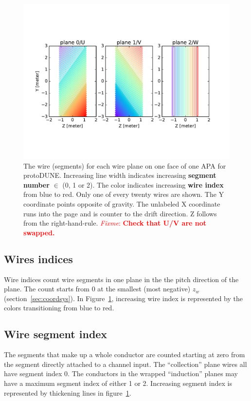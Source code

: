 \documentclass[pdftex,12pt,letter]{article}
\newcommand{\fixme}[1]{\textcolor{red}{\textit{Fixme}: \textbf{#1}}}
\begin{document}
\begin{figure}[htp]
  \centering
  \includegraphics[width=\textwidth,clip,trim=0 3cm 0 3cm]{wires-20.pdf}
  \caption{The wire (segments) for each wire plane on one face of one APA for protoDUNE.  Increasing line width indicates increasing \textbf{segment number} $\in$ (0, 1 or 2).  The color indicates increasing \textbf{wire index} from blue to red.  Only one of every twenty wires are shown. The Y coordinate points opposite of gravity.  The unlabeled X coordinate runs into the page and is counter to the drift direction.  Z follows from the right-hand-rule.  \fixme{Check that U/V are not swapped.}}
  \label{fig:wires}
\end{figure}


\subsection{Wires indices}

Wire indices count wire segments in one plane in the the pitch
direction of the plane.  The count starts from 0 at the smallest (most
negative) $z_w$ (section~\ref{sec:coordsys}).  In
Figure~\ref{fig:wires}, increasing wire index is represented by the
colors transitioning from blue to red.

\subsection{Wire segment index}

The segments that make up a whole conductor are counted starting at
zero from the segment directly attached to a channel input.  The
``collection'' plane wires all have segment index 0.  The conductors
in the wrapped ``induction'' planes may have a maximum segment index
of either 1 or 2.  Increasing segment index is represented by
thickening lines in figure~\ref{fig:wires}.
\end{document}
